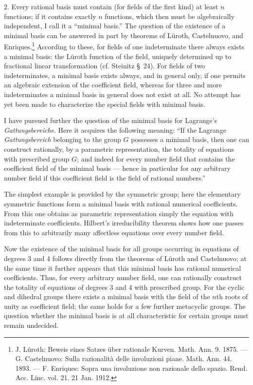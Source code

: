 \documentclass[11pt]{article}
\begin{document}
2. Every rational basis must contain (for fields of the first kind) at least $n$ functions; if it contains exactly $n$ functions, which then must be algebraically independent, I call it a ``minimal basis.'' The question of the existence of a minimal basis can be answered in part by theorems of Lüroth, Castelnuovo, and Enriques.\footnote{J. Lüroth: Beweis eines Satzes über rationale Kurven. Math. Ann. 9. 1875. --- G. Castelnuovo: Sulla razionalità delle involuzioni piane. Math. Ann. 44. 1893. --- F. Enriques: Sopra una involuzione non razionale dello spazio. Rend. Acc. Linc. vol. 21. 21 Jan. 1912.} According to these, for fields of one indeterminate there always exists a minimal basis: the Lüroth function of the field, uniquely determined up to fractional linear transformation (cf. Steinitz \S\ 24). For fields of two indeterminates, a minimal basis exists always, and in general only, if one permits an algebraic extension of the coefficient field, whereas for three and more indeterminates a minimal basis in general does not exist at all. No attempt has yet been made to characterize the special fields with minimal basis.

I have pursued further the question of the minimal basis for Lagrange's \emph{Gattungsbereiche}. Here it acquires the following meaning: ``If the Lagrange \emph{Gattungsbereich} belonging to the group $G$ possesses a minimal basis, then one can construct rationally, by a parametric representation, the totality of equations with prescribed group $G$; and indeed for every number field that contains the coefficient field of the minimal basis --- hence in particular for any arbitrary number field if this coefficient field is the field of rational numbers.''

The simplest example is provided by the symmetric group; here the elementary symmetric functions form a minimal basis with rational numerical coefficients. From this one obtains as parametric representation simply the equation with indeterminate coefficients. Hilbert's irreducibility theorem shows how one passes from this to arbitrarily many affectless equations over every number field.

Now the existence of the minimal basis for all groups occurring in equations of degrees 3 and 4 follows directly from the theorems of Lüroth and Castelnuovo; at the same time it further appears that this minimal basis has rational numerical coefficients. Thus, for every arbitrary number field, one can rationally construct the totality of equations of degrees 3 and 4 with prescribed group. For the cyclic and dihedral groups there exists a minimal basis with the field of the $n$th roots of unity as coefficient field; the same holds for a few further metacyclic groups. The question whether the minimal basis is at all characteristic for certain groups must remain undecided.
\end{document}
